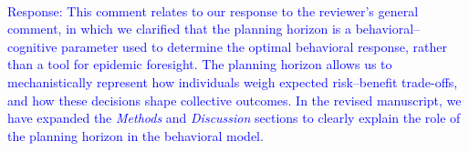 \documentclass{article}
\newcommand{\blue}[1]{{\textcolor{blue}{#1}}}
\newcommand{\red}[1]{{\textcolor{red}{#1}}}
\begin{document}
\begin{enumerate}
    \blue{\\Response: 
    This comment relates to our response to the reviewer's general comment, in which we clarified that the planning horizon is a behavioral–cognitive parameter used to determine the optimal behavioral response, rather than a tool for epidemic foresight. The planning horizon allows us to mechanistically represent how individuals weigh expected risk–benefit trade-offs, and how these decisions shape collective outcomes.
    In the revised manuscript, we have expanded the {\it Methods} and {\it Discussion} sections to clearly explain the role of the planning horizon in the behavioral model.
    }


    

\end{enumerate}
\end{document}
